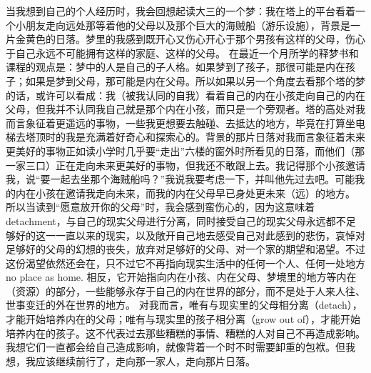 当我想到自己的个人经历时，我会回想起读大三的一个梦：我在塔上的平台看着一个小朋友走向远处那等着他的父母以及那个巨大的海贼船（游乐设施），背景是一片金黄色的日落。梦里的我感到既开心又伤心\pozhehao{}开心于那个男孩有这样的父母，伤心于自己永远不可能拥有这样的家庭、这样的父母。
在最近一个月所学的释梦书和课程的观点是：梦中的人是自己的子人格。如果梦到了孩子，那很可能是内在孩子；如果是梦到父母，那可能是内在父母。所以如果以另一个角度去看那个塔的梦的话，或许可以看成：我（被我认同的自我）看着自己的内在小孩走向自己的内在父母，但我并不认同我自己就是那个内在小孩，而只是一个旁观者。塔的高处对我而言象征着更遥远的事物，一些我更想要去触碰、去抵达的地方，毕竟在打算坐电梯去塔顶时的我是充满着好奇心和探索心的。背景的那片日落对我而言象征着未来更美好的事物\pozhehao{}正如读小学时几乎要“走出”六楼的窗外时所看见的日落，而他们（那一家三口）正在走向未来更美好的事物，但我还不敢跟上去。我记得那个小孩邀请我，说“要一起去坐那个海贼船吗？”我说我要考虑一下，并叫他先过去吧。可能我的内在小孩在邀请我走向未来，而我的内在父母早已身处更未来（远）的地方。
所以当读到“愿意放开你的父母”时，我会感到蛮伤心的，因为这意味着detachment，与自己的现实父母进行分离，同时接受自己的现实父母永远都不足够好的这一一直以来的现实，以及敞开自己地去感受自己对此感到的悲伤，哀悼对足够好的父母的幻想的丧失，放弃对足够好的父母、对一个家的期望和渴望。不过这份渴望依然还会在，只不过它不再指向现实生活中的任何一个人、任何一处地方\pozhehao{}no place as home. 相反，它开始指向内在小孩、内在父母、梦境里的地方等内在（资源）的部分，一些能够永存于自己的内在世界的部分，而不是处于人来人往、世事变迁的外在世界的地方。
对我而言，唯有与现实里的父母相分离（detach），才能开始培养内在的父母；唯有与现实里的孩子相分离（grow out of），才能开始培养内在的孩子。这不代表过去那些糟糕的事情、糟糕的人对自己不再造成影响。我想它们一直都会给自己造成影响，就像背着一个时不时需要卸重的包袱。但我想，我应该继续前行了，走向那一家人，走向那片日落。

